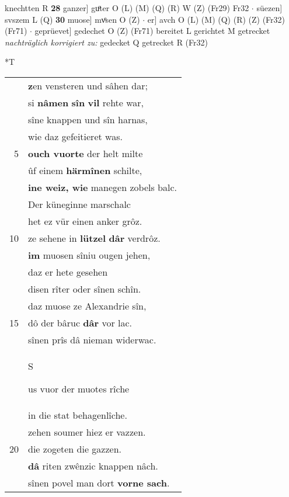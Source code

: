 \documentclass[8pt,a4paper,notitlepage]{article}
\begin{document}
\begin{table}[ht]
\begin{minipage}[t]{0.5\linewidth}
knechtten R \textbf{28} ganzer] guͦter O (L) (M) (Q) (R) W (Z) (Fr29) Fr32  $\cdot$ süezen] svszem L (Q) \textbf{30} muose] mvͦsen O (Z)  $\cdot$ er] avch O (L) (M) (Q) (R) (Z) (Fr32) (Fr71)  $\cdot$ geprüevet] gedechet O (Z) (Fr71) bereitet L gerichtet M getrecket \textit{nachträglich korrigiert zu:} gedecket Q getrecket R (Fr32) \newline
\end{minipage}
\hspace{0.5cm}
\begin{minipage}[t]{0.5\linewidth}
\small
\begin{center}*T
\end{center}
\begin{tabular}{rl}
 & \textbf{z}en vensteren und sâhen dar;\\ 
 & si \textbf{nâmen} \textbf{sîn} \textbf{vil} rehte war,\\ 
 & sîne knappen und sîn harnas,\\ 
 & wie daz gefeitieret was.\\ 
5 & \textbf{ouch vuorte} der helt milte\\ 
 & ûf einem \textbf{härmînen} schilte,\\ 
 & \textbf{ine weiz, wie} manegen zobels balc.\\ 
 & Der küneginne marschalc\\ 
 & het ez vür einen anker grôz.\\ 
10 & ze sehene in \textbf{lützel} \textbf{dâr} verdrôz.\\ 
 & \textbf{im} muosen sîniu ougen jehen,\\ 
 & daz er hete gesehen\\ 
 & disen rîter oder sînen schîn.\\ 
 & daz muose ze Alexandrie sîn,\\ 
15 & dô der bâruc \textbf{dâr} vor lac.\\ 
 & sînen prîs dâ nieman widerwac.\\ 
 & \begin{large}S\end{large}us vuor der muotes rîche\\ 
 & in die stat behagenlîche.\\ 
 & zehen soumer hiez er vazzen.\\ 
20 & die zogeten die gazzen.\\ 
 & \textbf{dâ} riten zwênzic knappen nâch.\\ 
 & sînen povel man dort \textbf{vorne sach}.\\ 

\end{tabular}
\end{minipage}
\end{table}
\end{document}
